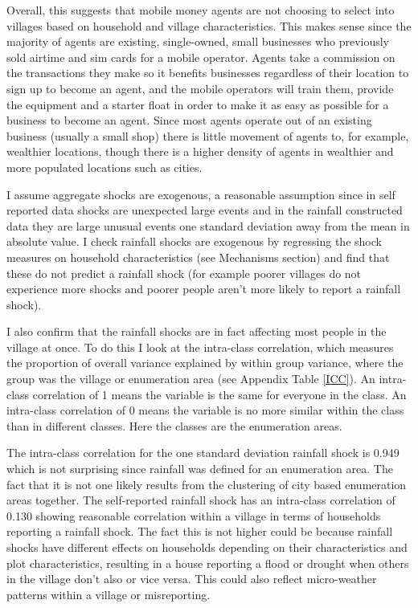 Overall, this suggests that mobile money agents are not choosing to select into villages based on household and village characteristics. This makes sense since the majority of agents are existing, single-owned, small businesses who previously sold airtime and sim cards for a mobile operator. Agents take a commission on the transactions they make so it benefits businesses regardless of their location to sign up to become an agent, and the mobile operators will train them, provide the equipment and a starter float in order to make it as easy as possible for a business to become an agent. Since most agents operate out of an existing business (usually a small shop) there is little movement of agents to, for example, wealthier locations, though there is a higher density of agents in wealthier and more populated locations such as cities. 


I assume aggregate shocks are exogenous, a reasonable assumption since in self reported data shocks are unexpected large events and in the rainfall constructed data they are large unusual events one standard deviation away from the mean in absolute value. I check rainfall shocks are exogenous by regressing the shock measures on household characteristics (see Mechanisms section) and find that these do not predict a rainfall shock (for example poorer villages do not experience more shocks and poorer people aren't more likely to report a rainfall shock).  

I also confirm that the rainfall shocks are in fact affecting most people in the village at once. To do this I look at the intra-class correlation, which measures the proportion of overall variance explained by within group variance, where the group was the village or enumeration area (see Appendix Table \ref{ICC}). An intra-class correlation of 1 means the variable is the same for everyone in the class. An intra-class correlation of 0 means the variable is no more similar within the class than in different classes. Here the classes are the enumeration areas. 

The intra-class correlation for the one standard deviation rainfall shock is 0.949 which is not surprising since rainfall was defined for an enumeration area. The fact that it is not one likely results from the clustering of city based enumeration areas together. The self-reported rainfall shock has an intra-class correlation of 0.130 showing reasonable correlation within a village in terms of households reporting a rainfall shock. The fact this is not higher could be because rainfall shocks have different effects on households depending on their characteristics and plot characteristics, resulting in a house reporting a flood or drought when others in the village don't also or vice versa. This could also reflect micro-weather patterns within a village or misreporting.   
